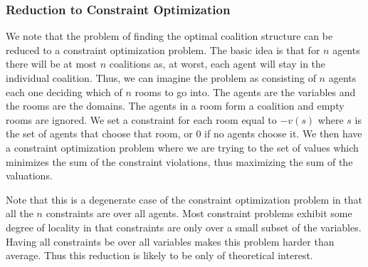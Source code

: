 \subsubsection{Reduction to Constraint Optimization}
\label{sec:reduct-constr-optim}

We note that the problem of finding the optimal coalition structure
can be reduced to a constraint optimization problem. The basic idea is
that for $n$ agents there will be at most $n$ coalitions as, at worst,
each agent will stay in the individual coalition. Thus, we can imagine
the problem as consisting of $n$ agents each one deciding which of $n$
rooms to go into. The agents are the variables and the rooms are the
domains. The agents in a room form a coalition and empty rooms are
ignored. We set a constraint for each room equal to $- v(s)$ where $s$
is the set of agents that choose that room, or 0 if no agents choose
it.  We then have a constraint optimization problem where we are
trying to the set of values which minimizes the sum of the constraint
violations, thus maximizing the sum of the valuations.

Note that this is a degenerate case of the constraint optimization
problem in that all the $n$ constraints are over all agents. Most
constraint problems exhibit some degree of locality in that
constraints are only over a small subset of the variables. Having all
constraints be over all variables makes this problem harder than
average. Thus this reduction is likely to be only of theoretical
interest.




